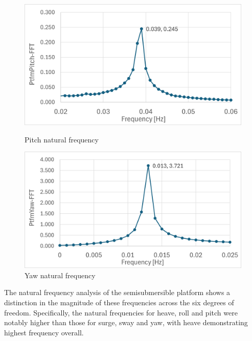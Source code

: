 \documentclass[a4paper, 11pt]{article}
\begin{document}
\begin{figure}[H]
    \begin{minipage}{0.49\textwidth}
        \centering
        \includegraphics[width=1\textwidth]{nat_freq_pitch.png}
        \caption{\small Pitch natural frequency}
        \label{fig:nat_freq_pitch}
    \end{minipage}
    \hfill
    \begin{minipage}{0.5\textwidth}
        \centering
        \includegraphics[width=1\textwidth]{nat_freq_yaw.png}
        \caption{\small Yaw natural frequency}
        \label{fig:nat_freq_yaw}
    \end{minipage}
\end{figure}

The natural frequency analysis of the semisubmersible platform shows a distinction in the magnitude of these frequencies across the six degrees of freedom. Specifically, the natural frequencies for heave, roll and pitch were notably higher than those for surge, sway and yaw, with heave demonstrating highest frequency overall.
\end{document}
